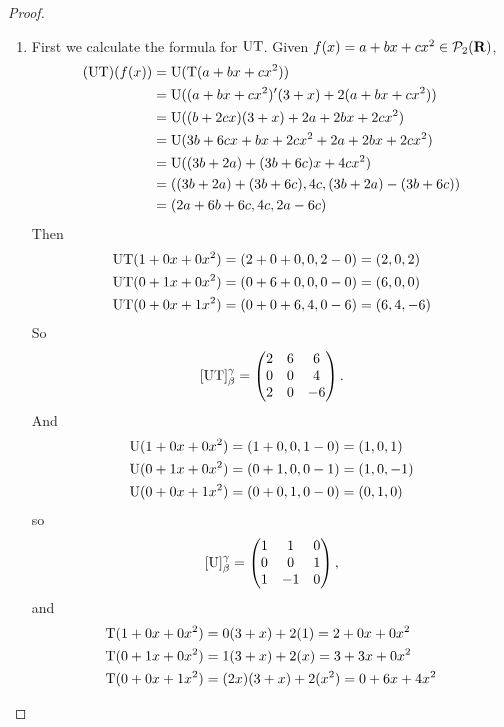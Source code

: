 \begin{proof} \ 
\begin{enumerate}
\item
First we calculate the formula for \(\mathrm{U}\mathrm{T}\).
Given \(f(x) = a + bx + cx^2 \in \mathcal{P}_2(\mathbf{R})\),
\begin{align*}
    (\mathrm{U}\mathrm{T})(f(x)) & = \mathrm{U}(\mathrm{T}(a + bx + cx^2)) \\
                 & = \mathrm{U}((a + bx + cx^2)'(3 + x) + 2(a + bx + cx^2)) \\
                 & = \mathrm{U}((b + 2cx)(3 + x) + 2a + 2bx + 2cx^2) \\
                 & = \mathrm{U}(3b + 6cx + bx + 2cx^2 + 2a + 2bx + 2cx^2) \\
                 & = \mathrm{U}((3b + 2a) + (3b + 6c)x + 4cx^2) \\
                 & = ((3b + 2a) + (3b + 6c), 4c, (3b + 2a) - (3b + 6c)) \\
                 & = (2a + 6b + 6c, 4c, 2a - 6c)
\end{align*}
Then
\begin{align*}
    \mathrm{U}\mathrm{T}(1 + 0x + 0x^2) & = (2 + 0 + 0, 0, 2 - 0) = (2, 0, 2) \\
    \mathrm{U}\mathrm{T}(0 + 1x + 0x^2) & = (0 + 6 + 0, 0, 0 - 0) = (6, 0, 0) \\
    \mathrm{U}\mathrm{T}(0 + 0x + 1x^2) & = (0 + 0 + 6, 4, 0 - 6) = (6, 4, -6)
\end{align*}
So
\[
    [\mathrm{U}\mathrm{T}]_{\beta}^{\gamma} = \begin{pmatrix} 2 & 6 & 6 \\ 0 & 0 & 4 \\ 2 & 0 & -6 \end{pmatrix}.
\]
And
\begin{align*}
    \mathrm{U}(1 + 0x + 0x^2) & = (1 + 0, 0, 1 - 0) = (1, 0, 1) \\
    \mathrm{U}(0 + 1x + 0x^2) & = (0 + 1, 0, 0 - 1) = (1, 0, -1) \\
    \mathrm{U}(0 + 0x + 1x^2) & = (0 + 0, 1, 0 - 0) = (0, 1, 0)
\end{align*}
so
\[
    [\mathrm{U}]_{\beta}^{\gamma} = \begin{pmatrix} 1 & 1 & 0 \\ 0 & 0 & 1 \\ 1 & -1 & 0 \end{pmatrix},
\]
and
\begin{align*}
    \T(1 + 0x + 0x^2) & = 0(3 + x) + 2(1) = 2 + 0x + 0x^2 \\
    \T(0 + 1x + 0x^2) & = 1(3 + x) + 2(x) = 3 + 3x + 0x^2 \\
    \T(0 + 0x + 1x^2) & = (2x)(3 + x) + 2(x^2) = 0 + 6x + 4x^2

\end{align*}
\end{enumerate}
\end{proof}
